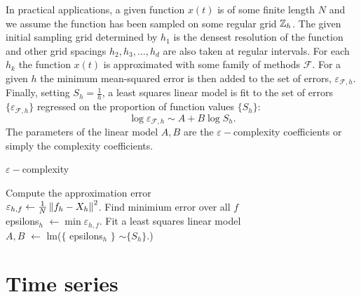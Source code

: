   In practical applications, a given function $x(t)$ is of some finite length $N$ and we assume the function has been sampled on some regular grid $\mathbb{Z}_h$.  The given initial sampling grid determined by $h_1$ is the densest resolution of the function and other grid spacings $h_2, h_3, ..., h_d$ are also taken at regular intervals.  
  For each $h_k$ the function $x(t)$ is approximated 
   with some family of methods
    $\mathcal{F}$. For a given $h$ the minimum mean-squared error
   is then added to the set of errors, 
   $\varepsilon_{\mathcal{F}, h}$. 
   Finally, setting $S_h = \frac{1}{h}$, a least squares linear model is fit to the set of errors   $ \{ \varepsilon_{\mathcal{F}, h} \}$ regressed on the proportion of function values 
   $\{ S_h \} $:
  \[
      \log  \varepsilon_{\mathcal{F}, h} 
      \sim A + B \log S_h.
  \]
  The parameters of the linear model $A, B$ are the 
  $\varepsilon-$complexity coefficients or simply the  
  complexity coefficients.

   \begin{algorithm}[htb]
    \label{alg:ecomplexity}
  \caption{$\varepsilon-$complexity \label{alg:ecomplex}}
  \DontPrintSemicolon
  \SetAlgoLined
  \BlankLine 
  {    
     {
        Compute the approximation error \\ 
        $\varepsilon_{h,f} \leftarrow 
       \frac{1}{N}\left\lVert f_h - X_{h} \right\rVert^2$.  \;
    } 
     Find minimium error over all $f$  \\
     epsilons$_h$ $\leftarrow \min \varepsilon_{h,f}$. \;
  }
  Fit a least squares linear model \\
   $A,B$ $\leftarrow$ lm($\{$ epsilons$_h$ $\}$ $ \sim \{ S_h \} $.) \;
  \end{algorithm}




\section{Time series}
  
